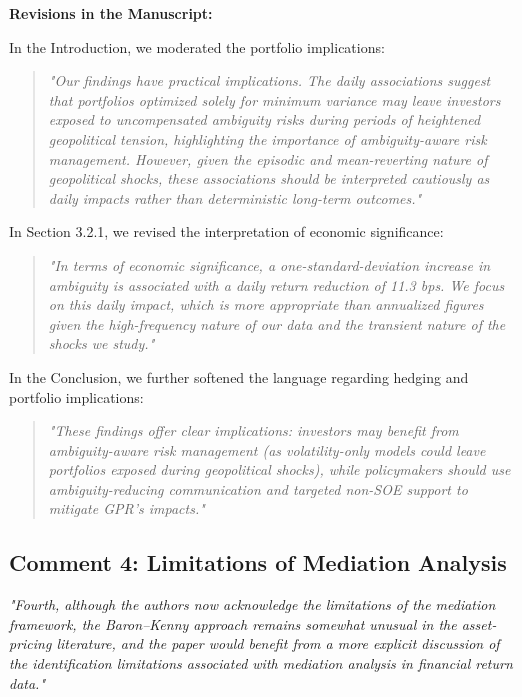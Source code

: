 \documentclass[12pt]{article}
\begin{document}
\begin{highlightbox}
\textbf{Revisions in the Manuscript:}

In the Introduction, we moderated the portfolio implications:
\vspace{0.2cm}
\begin{quote}
\color{red}\itshape "Our findings have practical implications. The daily associations suggest that portfolios optimized solely for minimum variance may leave investors exposed to uncompensated ambiguity risks during periods of heightened geopolitical tension, highlighting the importance of ambiguity-aware risk management. However, given the episodic and mean-reverting nature of geopolitical shocks, these associations should be interpreted cautiously as daily impacts rather than deterministic long-term outcomes."
\end{quote}
\vspace{0.2cm}

In Section 3.2.1, we revised the interpretation of economic significance:
\vspace{0.5cm}
\begin{quote}
\color{red}\itshape "In terms of economic significance, a one-standard-deviation increase in ambiguity is associated with a daily return reduction of 11.3 bps. We focus on this daily impact, which is more appropriate than annualized figures given the high-frequency nature of our data and the transient nature of the shocks we study."
\end{quote}
\vspace{0.2cm}

In the Conclusion, we further softened the language regarding hedging and portfolio implications:
\vspace{0.2cm}
\begin{quote}
\color{red}\itshape "These findings offer clear implications: investors may benefit from ambiguity-aware risk management (as volatility-only models could leave portfolios exposed during geopolitical shocks), while policymakers should use ambiguity-reducing communication and targeted non-SOE support to mitigate GPR’s impacts."
\end{quote}
\end{highlightbox}

\subsection*{Comment 4: Limitations of Mediation Analysis}
\textit{"Fourth, although the authors now acknowledge the limitations of the mediation framework, the Baron–Kenny approach remains somewhat unusual in the asset-pricing literature, and the paper would benefit from a more explicit discussion of the identification limitations associated with mediation analysis in financial return data."}
\end{document}
